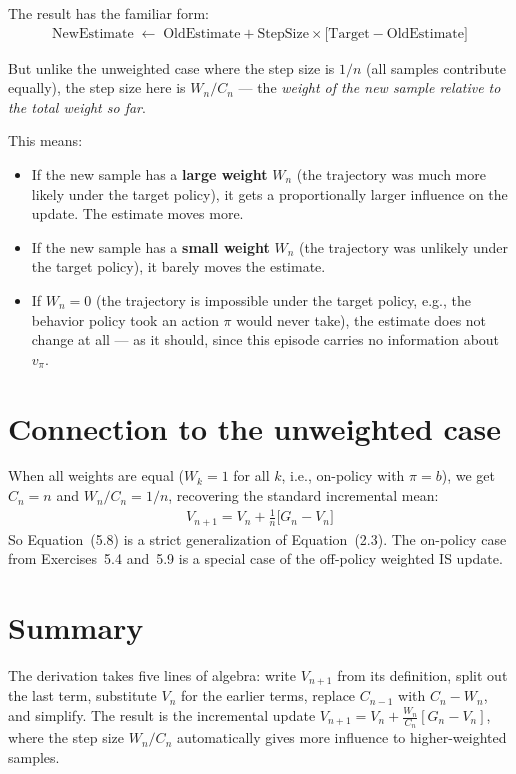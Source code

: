 \documentclass[11pt]{article}
\begin{document}
The result has the familiar form:
\begin{align}
    \text{NewEstimate} \;\leftarrow\; \text{OldEstimate} + \text{StepSize} \times \Big[\text{Target} - \text{OldEstimate}\Big]
\end{align}

But unlike the unweighted case where the step size is $1/n$ (all samples contribute equally), the step size here is $W_n / C_n$ --- the \textit{weight of the new sample relative to the total weight so far}.

This means:
\begin{itemize}[nosep]
    \item If the new sample has a \textbf{large weight} $W_n$ (the trajectory was much more likely under the target policy), it gets a proportionally larger influence on the update. The estimate moves more.
    \item If the new sample has a \textbf{small weight} $W_n$ (the trajectory was unlikely under the target policy), it barely moves the estimate.
    \item If $W_n = 0$ (the trajectory is impossible under the target policy, e.g., the behavior policy took an action $\pi$ would never take), the estimate does not change at all --- as it should, since this episode carries no information about $v_\pi$.
\end{itemize}

\section*{Connection to the unweighted case}

When all weights are equal ($W_k = 1$ for all $k$, i.e., on-policy with $\pi = b$), we get $C_n = n$ and $W_n / C_n = 1/n$, recovering the standard incremental mean:
\begin{align}
    V_{n+1} = V_n + \frac{1}{n}\Big[G_n - V_n\Big]
\end{align}
So Equation~(5.8) is a strict generalization of Equation~(2.3). The on-policy case from Exercises~5.4 and~5.9 is a special case of the off-policy weighted IS update.

\section*{Summary}

The derivation takes five lines of algebra: write $V_{n+1}$ from its definition, split out the last term, substitute $V_n$ for the earlier terms, replace $C_{n-1}$ with $C_n - W_n$, and simplify. The result is the incremental update $V_{n+1} = V_n + \frac{W_n}{C_n}[G_n - V_n]$, where the step size $W_n / C_n$ automatically gives more influence to higher-weighted samples.
\end{document}

